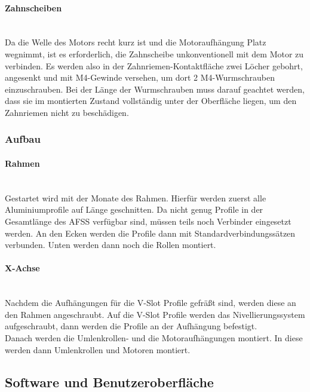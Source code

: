 \paragraph{Zahnscheiben}\mbox{}\\
Da die Welle des Motors recht kurz ist und die Motoraufhängung Platz wegnimmt, ist es erforderlich, die Zahnscheibe unkonventionell mit dem Motor zu verbinden. Es werden also in der Zahnriemen-Kontaktfläche zwei Löcher gebohrt, angesenkt und mit M4-Gewinde versehen, um dort 2 M4-Wurmschrauben einzuschrauben. Bei der Länge der Wurmschrauben muss darauf geachtet werden, dass sie im montierten Zustand vollständig unter der Oberfläche liegen, um den Zahnriemen nicht zu beschädigen.

\subsubsection{Aufbau}

\paragraph{Rahmen} \mbox{}\\
Gestartet wird mit der Monate des Rahmen. Hierfür werden zuerst alle Aluminiumprofile auf Länge geschnitten. Da nicht genug Profile in der Gesamtlänge des AFSS verfügbar sind, müssen teils noch Verbinder eingesetzt werden. An den Ecken werden die Profile dann mit Standardverbindungssätzen verbunden. Unten werden dann noch die Rollen montiert.

\paragraph{X-Achse} \mbox{}\\
Nachdem die Aufhängungen für die V-Slot Profile gefräßt sind, werden diese an den Rahmen angeschraubt. Auf die V-Slot Profile werden das Nivellierungssystem aufgeschraubt, dann werden die Profile an der Aufhängung befestigt. \\
Danach werden die Umlenkrollen- und die Motoraufhängungen montiert. In diese werden dann Umlenkrollen und Motoren montiert. \\




\newpage
\subsection{Software und Benutzeroberfläche}

